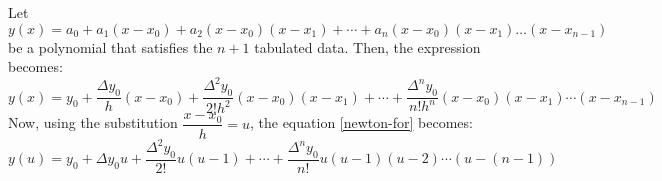 \documentclass[12pt,a4paper,landscape]{article}
\begin{document}
		Let
		\[ y(x) = a_0 + a_1 (x - x_0) + a_2 (x-x_0)(x-x_1) + \cdots + a_n (x-x_0)(x-x_1)\ldots (x-x_{n-1}) \]
		be a polynomial that satisfies the $n+1$ tabulated data. Then, the expression becomes:
		\begin{dmath}\label{newton-for}			
		y(x) = y_0 + \dfrac{\Delta y_0}{h} (x-x_0) + \dfrac{\Delta^2 y_0}{2! h^2} (x-x_0)(x-x_1)+ \cdots + \dfrac{\Delta^n y_0}{n! h^n} (x-x_0)(x-x_1)\cdots (x-x_{n-1})
		\end{dmath}
		Now, using the substitution $\dfrac{x-x_0}{h} = u$, the equation \ref{newton-for} becomes:
		\begin{equation}\label{newton-for-u}
			\boxed{y(u) = y_0 + \Delta y_0u + \dfrac{\Delta^2 y_0}{2!} u(u-1) + \cdots + \dfrac{\Delta^n y_0}{n!} u(u-1)(u-2)\cdots (u-(n-1))}
		\end{equation}
		
\end{document}
